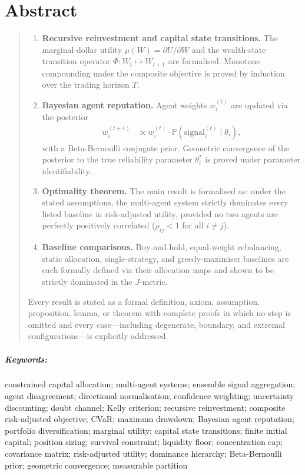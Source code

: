 \documentclass[12pt,openany]{book}
\numberwithin{equation}{chapter}
\theoremstyle{plain}
\theoremstyle{definition}
\theoremstyle{remark}
\newenvironment{abstract}{%
  \chapter*{Abstract}
  \begin{quote}\small
}{%
  \end{quote}
}
\newenvironment{keywords}{%
  \paragraph*{Keywords:}
}{%
}
\numberwithin{equation}{chapter}
\theoremstyle{plain}
\begin{document}
\begin{abstract}
\begin{enumerate}[label=\textbf{\arabic*.}, leftmargin=2em,
                  itemsep=4pt, parsep=0pt, topsep=4pt]
  \item \textbf{Recursive reinvestment and capital state
        transitions.}\enspace
        The marginal-dollar utility $\mu(W) = \partial U / \partial W$
        and the wealth-state transition operator
        $\Phi: W_t \mapsto W_{t+1}$ are formalised.
        Monotone compounding under the composite objective is
        proved by induction over the trading horizon $T$.

  \item \textbf{Bayesian agent reputation.}\enspace
        Agent weights $w_i^{(t)}$ are updated via the posterior
        \begin{align*}
          w_i^{(t+1)}
            &\propto w_i^{(t)} \cdot
              \mathbb{P}\!\left(\text{signal}_i^{(t)}
                \mid \theta_i\right),
        \end{align*}
        with a Beta-Bernoulli conjugate prior.  Geometric
        convergence of the posterior to the true reliability
        parameter $\theta_i^*$ is proved under parameter
        identifiability.

  \item \textbf{Optimality theorem.}\enspace
        The main result is formalised as: under the stated
        assumptions, the multi-agent system strictly dominates
        every listed baseline in risk-adjusted utility, provided
        no two agents are perfectly positively correlated
        ($\rho_{ij} < 1$ for all $i \neq j$).

  \item \textbf{Baseline comparisons.}\enspace
        Buy-and-hold, equal-weight rebalancing, static allocation,
        single-strategy, and greedy-maximiser baselines are each
        formally defined via their allocation maps and shown to be
        strictly dominated in the $J$-metric.

\end{enumerate}

\medskip
\noindent
Every result is stated as a formal definition, axiom, assumption,
proposition, lemma, or theorem with complete proofs in which no
step is omitted and every case---including degenerate, boundary,
and extremal configurations---is explicitly addressed.
\end{abstract}

\begin{keywords}
constrained capital allocation; multi-agent systems; ensemble signal
aggregation; agent disagreement; directional normalisation; confidence
weighting; uncertainty discounting; doubt channel; Kelly criterion;
recursive reinvestment; composite risk-adjusted objective; CVaR;
maximum drawdown; Bayesian agent reputation; portfolio diversification;
marginal utility; capital state transitions; finite initial capital;
position sizing; survival constraint; liquidity floor; concentration cap;
covariance matrix; risk-adjusted utility; dominance hierarchy;
Beta-Bernoulli prior; geometric convergence; measurable partition
\end{keywords}
\end{document}
